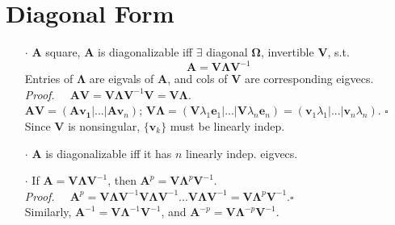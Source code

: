 \documentclass[a4paper, 11pt]{article}
\begin{document}
\section{Diagonal Form}
\begin{itemize}
  \item[$\cdot$] $\bm{A}$ square, $\bm{A}$ is diagonalizable iff $\exists$ diagonal $\bm{\Omega}$, invertible $\bm{V}$, s.t.
  $$
  \bm{A} = \bm{V} \bm{\Lambda} \bm{V}^{-1} 
  $$
  Entries of $\bm{\Lambda}$ are eigvals of $\bm{A}$, and cols of $\bm{V}$ are corresponding eigvecs.\\
  \textit{Proof.~~} $\bm{AV} = \bm{V} \bm{\Lambda} \bm{V}^{-1} \bm{V}=\bm{V\Lambda}$. \\
  $\bm{AV}=(\bm{A}\bm{v_1} | ... | \bm{A}\bm{v}_n)$; $\bm{V\Lambda}=(\bm{V}\lambda_1 \bm{e}_1|...|\bm{V}\lambda_n \bm{e}_n)=(\bm{v}_1\lambda_1|...|\bm{v}_n\lambda_n)$. $\square$\\
  Since $\bm{V}$ is nonsingular, $\{\bm{v}_k\}$ must be linearly indep.
  \item[$\cdot$] $\bm{A}$ is diagonalizable iff it has $n$ linearly indep. eigvecs.
  \item[$\cdot$] If $\bm{A} = \bm{V} \bm{\Lambda} \bm{V}^{-1} $, then $\bm{A}^p = \bm{V} \bm{\Lambda}^p \bm{V}^{-1} $. \\
  \textit{Proof.~~} $\bm{A}^p = \bm{V} \bm{\Lambda} \bm{V}^{-1}\bm{V} \bm{\Lambda} \bm{V}^{-1}...\bm{V} \bm{\Lambda} \bm{V}^{-1}=\bm{V} \bm{\Lambda}^p \bm{V}^{-1}$.$\square$\\
  Similarly, $\bm{A}^{-1}=\bm{V} \bm{\Lambda}^{-1} \bm{V}^{-1} $, and $\bm{A}^{-p} = \bm{V} \bm{\Lambda}^{-p} \bm{V}^{-1} $.
\end{itemize}
\end{document}
